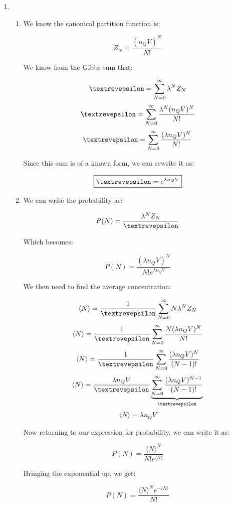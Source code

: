 \begin{enumerate}
\begin{enumerate}
    \end{enumerate}

  \item

    \begin{enumerate}

      \item 

        We know the canonical partition function is:

        $$Z_N=\frac{(n_QV)^N}{N!}$$

        We know from the Gibbs sum that:

        $$\text{\textrevepsilon}=\sum_{N=0}^\infty \lambda^NZ_N$$
        $$\text{\textrevepsilon}=\sum_{N=0}^\infty \frac{\lambda^N(n_QV)^N}{N!}$$
        $$\text{\textrevepsilon}=\sum_{N=0}^\infty \frac{(\lambda n_QV)^N}{N!}$$

        Since this sum is of a known form, we can rewrite it as:

        $$\boxed{\text{\textrevepsilon}=e^{\lambda n_Q V}}$$

      \item 

        We can write the probability as:

        $$P(N)=\frac{\lambda^NZ_N}{\text{\textrevepsilon}}$$

        Which becomes:

        $$P(N)=\frac{(\lambda n_QV)^N}{N!e^{\lambda n_QV}}$$

        We then need to find the average concentration:

        $$\langle N\rangle=\frac{1}{\textrevepsilon}\sum_{N=0}^\infty N\lambda ^NZ_N$$
        $$\langle N\rangle=\frac{1}{\textrevepsilon}\sum_{N=0}^\infty \frac{N(\lambda n_QV)^N}{N!}$$
        $$\langle N\rangle=\frac{1}{\textrevepsilon}\sum_{N=0}^\infty \frac{(\lambda n_QV)^N}{(N-1)!}$$
        $$\langle N\rangle=\frac{\lambda n_Q V}{\textrevepsilon}\underbrace{\sum_{N=0}^\infty \frac{(\lambda n_QV)^{N-1}}{(N-1)!}}_{\text{\textrevepsilon}}$$
        $$\langle N\rangle=\lambda n_Q V$$

        Now returning to our expression for probability, we can write it as:

        $$P(N)=\frac{\langle N\rangle^N}{N!e^{\langle N\rangle}}$$

        Bringing the exponential up, we get:

        $$\boxed{P(N)=\frac{\langle N\rangle^Ne^{-\langle N\rangle}}{N!}}$$


\end{enumerate}
\end{enumerate}
